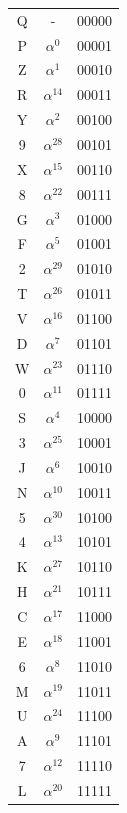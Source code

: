 \documentclass[letterpaper]{article}
\theoremstyle{xxx}
\theoremstyle{evil}
\theoremstyle{yyy}
\theoremstyle{plain}
\theoremstyle{zzz}
\begin{document}
\begin{minipage}[b]{0.3\linewidth}
\begin{center}
\begin{tabular}{|ccc|}
\hline
Q & - & 00000 \\
P & $\alpha^0$ & 00001 \\
Z & $\alpha^1$ & 00010 \\
R & $\alpha^{14}$ & 00011 \\
Y & $\alpha^2$ & 00100 \\
9 & $\alpha^{28}$ & 00101 \\
X & $\alpha^{15}$ & 00110 \\
8 & $\alpha^{22}$ & 00111 \\
G & $\alpha^3$ & 01000 \\
F & $\alpha^5$ & 01001 \\
2 & $\alpha^{29}$ & 01010 \\
T & $\alpha^{26}$ & 01011 \\
V & $\alpha^{16}$ & 01100 \\
D & $\alpha^7$ & 01101 \\
W & $\alpha^{23}$ & 01110 \\
0 & $\alpha^{11}$ & 01111 \\
S & $\alpha^4$ & 10000 \\
3 & $\alpha^{25}$ & 10001 \\
J & $\alpha^6$ & 10010 \\
N & $\alpha^{10}$ & 10011 \\
5 & $\alpha^{30}$ & 10100 \\
4 & $\alpha^{13}$ & 10101 \\
K & $\alpha^{27}$ & 10110 \\
H & $\alpha^{21}$ & 10111 \\
C & $\alpha^{17}$ & 11000 \\
E & $\alpha^{18}$ & 11001 \\
6 & $\alpha^8$ & 11010 \\
M & $\alpha^{19}$ & 11011 \\
U & $\alpha^{24}$ & 11100 \\
A & $\alpha^9$ & 11101 \\
7 & $\alpha^{12}$ & 11110 \\
L & $\alpha^{20}$ & 11111 \\
\hline
\end{tabular}
\end{center}
\end{minipage}

\clearpage
\end{document}
